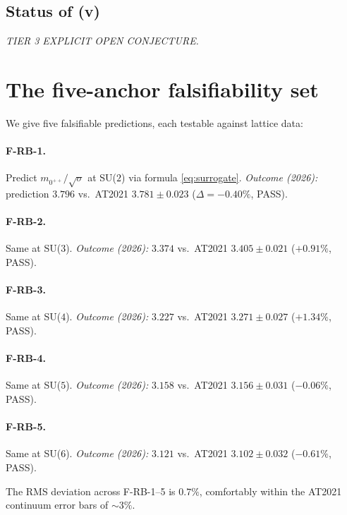 \documentclass[11pt,a4paper,reqno]{amsart}
\theoremstyle{definition}
\begin{document}
\subsection*{Status of (v)} \emph{TIER 3 EXPLICIT OPEN CONJECTURE.}

\section{The five-anchor falsifiability set}\label{sec:falsif}

We give five falsifiable predictions, each testable against lattice data:

\paragraph{F-RB-1.} Predict $m_{0^{++}}/\sqrt{\sigma}$ at SU($2$) via formula \eqref{eq:surrogate}. \emph{Outcome (2026):} prediction $3.796$ vs.~AT2021 $3.781\pm 0.023$ ($\Delta = -0.40\%$, PASS).

\paragraph{F-RB-2.} Same at SU($3$). \emph{Outcome (2026):} $3.374$ vs.~AT2021 $3.405\pm 0.021$ ($+0.91\%$, PASS).

\paragraph{F-RB-3.} Same at SU($4$). \emph{Outcome (2026):} $3.227$ vs.~AT2021 $3.271\pm 0.027$ ($+1.34\%$, PASS).

\paragraph{F-RB-4.} Same at SU($5$). \emph{Outcome (2026):} $3.158$ vs.~AT2021 $3.156\pm 0.031$ ($-0.06\%$, PASS).

\paragraph{F-RB-5.} Same at SU($6$). \emph{Outcome (2026):} $3.121$ vs.~AT2021 $3.102\pm 0.032$ ($-0.61\%$, PASS).

\smallskip

\noindent The RMS deviation across F-RB-1--5 is $0.7\%$, comfortably within the AT2021 continuum error bars of $\sim 3\%$.
\end{document}
